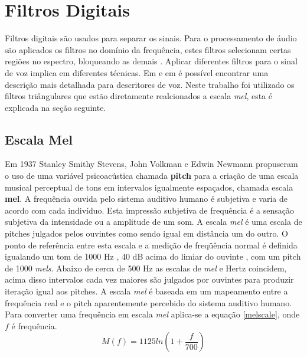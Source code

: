 \section{Filtros Digitais}
\label{sec:filt:tri}
\quad Filtros digitais são usados para separar os sinais.  Para o processamento de áudio são aplicados os filtros no domínio da frequência, estes filtros selecionam certas regiões  no espectro, bloqueando as demais \cite{sig}. Aplicar diferentes filtros para o sinal de voz implica em diferentes técnicas. Em \cite{mello} e em \cite{pucpncc} é possível encontrar uma descrição mais detalhada para descritores de voz. Neste trabalho foi utilizado os filtros triângulares que estão diretamente realcionados a escala \textit{mel}, esta é explicada na seção seguinte. 

\subsection{Escala Mel}
\label{sec:mel}
\quad Em 1937 Stanley Smithy Stevens, John Volkman e Edwin Newmann propuseram o uso de uma variável psicoacústica chamada  \textbf {pitch}  para a criação de uma escala musical perceptual de tons em intervalos igualmente espaçados, chamada escala  \textbf {mel}. A frequência ouvida pelo sistema auditivo humano é subjetiva e varia de acordo com cada indivíduo. Esta impressão subjetiva de frequência é a sensação subjetiva da intensidade ou a amplitude de um som. A escala \textit{mel} é uma escala de pitches julgados pelos ouvintes como sendo igual em distância um do outro. O ponto de referência entre esta escala e a medição de freqüência normal é definida  igualando um tom de 1000 Hz , 40 dB acima do limiar do ouvinte , com um pitch de 1000 \textit{mels}. Abaixo de cerca de 500 Hz as escalas de \textit{mel} e Hertz coincidem, acima disso intervalos cada vez maiores são julgados por ouvintes para produzir iteração igual aos pitches. A escala \textit{mel} é baseada em um mapeamento entre a frequência real e o pitch aparentemente percebido do sistema auditivo humano. Para converter uma frequência em escala \textit{mel} aplica-se a equação \ref{melscale}, onde $f$ é frequência.
\begin{equation}
\label{melscale}
M(f) = 1125 ln(1 + \frac{f}{700})
\end{equation}

